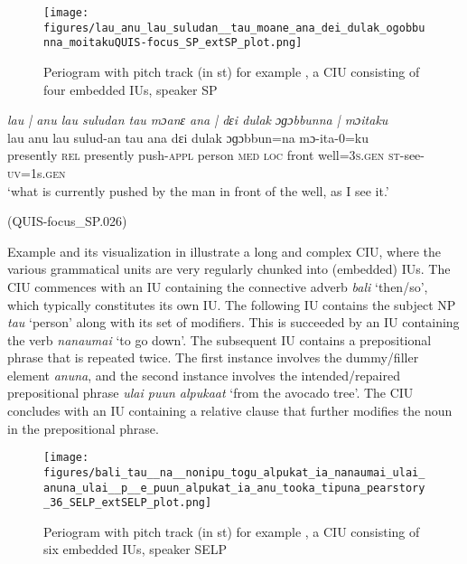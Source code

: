 \begin{figure}
	\texttt{[image: figures/lau\_anu\_lau\_suludan\_\_tau\_moane\_ana\_dei\_dulak\_ogobbunna\_moitakuQUIS-focus\_SP\_extSP\_plot.png]}
	\caption{Periogram with pitch track (in st) for example , a CIU consisting of four embedded IUs, speaker SP}
	\label{pitch:lau anu lau suludan tau moane ana dɛi dulak ɔɡɔbbunna moitaku}
\end{figure}




\ea
\label{ex:lau anu lau suludan tau moane ana dɛi dulak ɔɡɔbbunna moitaku}
\textit{lau | anu lau suludan tau mɔanɛ ana | dɛi dulak ɔɡɔbbunna | mɔitaku} \\
\gll lau anu lau sulud-an tau ana dɛi dulak ɔɡɔbbun=na  mɔ-ita-0=ku\\
presently \textsc{rel} presently push-\textsc{appl} person \textsc{med} \textsc{loc} front well=3\textsc{s}.\textsc{gen} \textsc{st}-see\textsc{-uv}=1s.\textsc{gen}\\ 
\glt ‘what is currently pushed by the man in front of the well, as 
I see it.’ \begin{flushright}(QUIS-focus\_SP.026)
	\end{flushright}
\z







Example  and its visualization in    illustrate a long and complex CIU, where the various grammatical units are very regularly chunked into (embedded) IUs. The CIU commences with an IU containing the connective adverb \textit{bali} `then/so', which typically constitutes its own IU. The following IU contains the subject NP \textit{tau} ‘person’  along with its set of modifiers. This is succeeded by an IU containing the verb \textit{nanaumai} ‘to go down’. The subsequent IU contains a prepositional phrase that is repeated twice. The first instance involves the dummy/filler element \textit{anuna}, and the second instance involves the intended/repaired prepositional phrase \textit{ulai puun alpukaat} ‘from the avocado tree’. The CIU concludes with an IU containing a relative clause that further modifies the noun in the prepositional phrase.




\begin{figure}
	\texttt{[image: figures/bali\_tau\_\_na\_\_nonipu\_togu\_alpukat\_ia\_nanaumai\_ulai\_anuna\_ulai\_\_p\_\_e\_puun\_alpukat\_ia\_anu\_tooka\_tipuna\_pearstory\_36\_SELP\_extSELP\_plot.png]}
	\caption{Periogram with pitch track (in st) for example , a CIU consisting of six embedded IUs, speaker SELP}
	\label{pitch:bali tau }
\end{figure}




